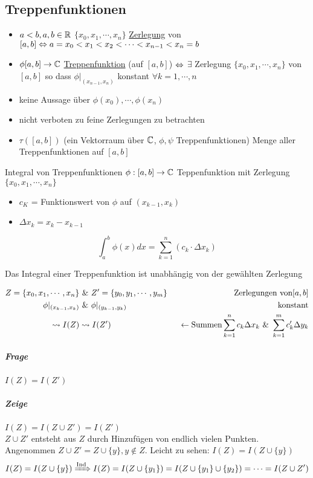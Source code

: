 \subsection{Treppenfunktionen}
\begin{itemize}
  \item $a<b, a,b\in\mathbb{R}$ $\{x_0,x_1,\cdots,x_n\}$ \underline{Zerlegung} von $[a,b] \Leftrightarrow a=x_0<x_1<x_2<\cdots<x_{n-1}<x_n = b$
  \item $\phi[a,b]\to\mathbb{C}$ \underline{Treppenfunktion} (auf $[a,b]$) $\Leftrightarrow$ $\exists$ Zerlegung $\{x_0,x_1,\cdots,x_n\}$ von $[a,b]$ so dass $\phi|_{(x_{n-1},x_n)}$ konstant $\forall k=1,\cdots,n$
\end{itemize}
\begin{Bem}
  \begin{itemize}
    \item keine Aussage über $\phi(x_0),\cdots,\phi(x_n)$
    \item nicht verboten zu feine Zerlegungen zu betrachten
  \end{itemize}
\end{Bem}
\begin{itemize}
  \item $\tau([a,b])$ (ein Vektorraum über $\mathbb{C}$, $\phi, \psi$ Treppenfunktionen) Menge aller Treppenfunktionen auf $[a,b]$
\end{itemize}
\begin{Def}{Integral von Treppenfunktionen} $\phi:[a,b]\to\mathbb{C}$ Teppenfunktion mit Zerlegung $\{x_0,x_1,\cdots,x_n\}$
  \begin{itemize}
    \item $c_K$ = Funktionswert von $\phi$ auf $(x_{k-1},x_k)$
    \item $\Delta x_k=x_k-x_{k-1}$
  \end{itemize}
  \[\int_a^b \phi(x)dx=\sum^n_{k=1}\left( c_k\cdot\Delta x_k \right)\]
\end{Def}
\begin{Lem}{}
  Das Integral einer Treppenfunktion ist unabhängig von der gewählten Zerlegung
\end{Lem}
\begin{Bew}{}
  \begin{align*}
    Z=\{x_0,x_1,\cdots,x_n\} &\ \&\  Z'= \{y_0,y_1,\cdots,y_m\} & \text{Zerlegungen von} [a,b]\\
    \phi|_{(x_{k-1},x_k)} &\ \&\  \phi|_{(y_{k-1},y_k)} & \text{konstant}\\
    \rightsquigarrow I(Z) & \rightsquigarrow I(Z') &\ \ \leftarrow \text{Summen} \sum^n_{k=1}c_k\Delta x_k \ \&\ \sum^m_{k=1}c'_k\Delta y_k
  \end{align*}
  \subparagraph{Frage} $I(Z)=I(Z')$
  \subparagraph{Zeige} $I(Z)=I(Z\cup Z')=I(Z')$\\
  $Z\cup Z'$ entsteht aus $Z$ durch Hinzufügen von endlich vielen Punkten.\\
  Angenommen $Z\cup Z' = Z\cup\{y\}, y\not\in Z$. Leicht zu sehen: $I(Z)=I(Z\cup\{y\})$
  \begin{align*}
    I(Z)=I(Z\cup\{y\})\xRightarrow{\text{Ind}} I(Z) = I(Z\cup\{y_1\})=I(Z\cup \{y_1\}\cup\{y_2\}) = \cdots = I(Z\cup Z')
  \end{align*}
\end{Bew}
